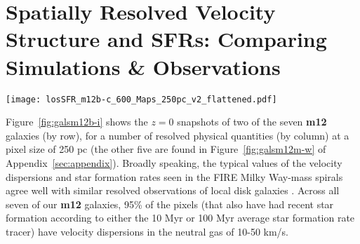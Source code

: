 \documentclass[usletter,fleqn,usenatbib]{mnras}
\begin{document}
\section{Spatially Resolved Velocity Structure and SFRs: Comparing Simulations \& Observations}\label{sec:results}
\begin{figure*}
	\centering
	\texttt{[image: losSFR\_m12b-c\_600\_Maps\_250pc\_v2\_flattened.pdf]}
	\caption{Face-on maps of star formation and gas quantities in two of the FIRE galaxies (\textbf{rows}: \textbf{m12b} and \textbf{m12c}, see Fig.~\ref{fig:galsm12m-w} for other galaxy simulations) at $z=0$ with 250 pc pixel size. Regions with fewer than $\sim10$ gas elements (or no star formation, in the cases of the right two columns) are excluded, and colored light grey. \textbf{Left:} Velocity dispersions (including inflow/outflow) in neutral (atomic + molecular) gas.  Spiral structures correspond to low $\sigma_z \lesssim 40$ km/s dispersions, with interspersed high-dispersion structures. \textbf{Center left:} Turbulent Toomre-Q parameter for gas, $\tilde Q_{\rm gas}$.  Bluer regions ($\tilde Q_{\rm gas} < 2$) are at least marginally unstable.  \textbf{Center right:} Gas depletion time averaged over 100 Myr. Several large ($\sim$kpc) regions with short depletion times correspond with large bubbles of high-$\tilde Q_{\rm gas}$, indicative of SNe super-bubbles. \textbf{Right:} ``Burstiness'' measure $\eta_{\rm burst} \equiv (\Sigma_{\rm SFR}^{\rm 10\,Myr}-\Sigma_{\rm SFR}^{\rm 100\,Myr})/(\Sigma_{\rm SFR}^{\rm 10\,Myr}+\Sigma_{\rm SFR}^{\rm 100\,Myr})$.  Redder (bluer) regions indicate rapidly decaying (rising) SFRs.  Much of the area of the galaxies are covered by regions with decaying local star formation, while small regions with locally rising SFRs correspond to GMCs.}
	\label{fig:galsm12b-i}
\end{figure*}

Figure~\ref{fig:galsm12b-i} shows the $z=0$ snapshots of two of the seven \textbf{m12} galaxies (by row), for a number of resolved physical quantities (by column) at a pixel size of 250 pc (the other five are found in Figure~\ref{fig:galsm12m-w} of Appendix~\ref{sec:appendix}).  Broadly speaking, the typical values of the velocity dispersions and star formation rates seen in the FIRE Milky Way-mass spirals agree well with similar resolved observations of local disk galaxies \citep{Rozas2006, Zhou2017, Querejeta2019}.  Across all seven of our \textbf{m12} galaxies, 95\% of the pixels (that also have had recent star formation according to either the 10 Myr or 100 Myr average star formation rate tracer) have velocity dispersions in the neutral gas of 10-50 km/s.
\end{document}
